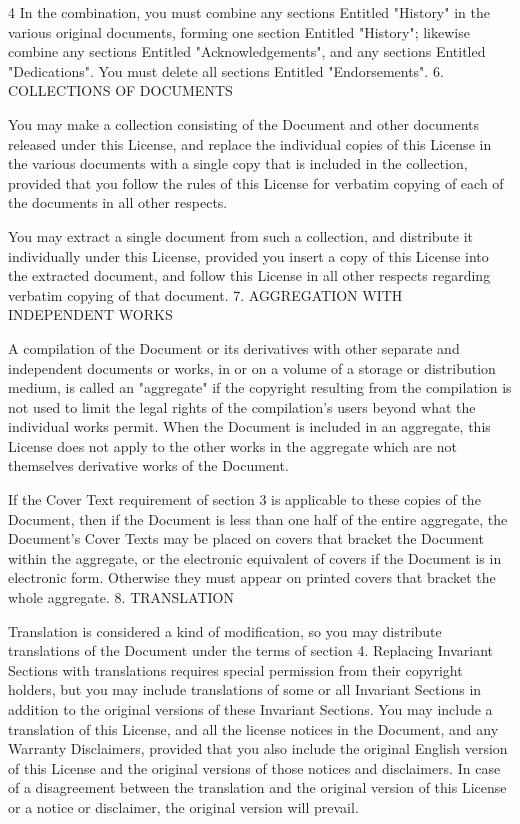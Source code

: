 \documentclass[fontsize=11pt,paper=A4,BCOR=12mm,DIV=13,open=any,listof=totoc,toc=flat]{scrbook}
\begin{document}
{\begin{multicols}{4}
In the combination, you must combine any sections Entitled "History" in the various original documents, forming one section Entitled "History"; likewise combine any sections Entitled "Acknowledgements", and any sections Entitled "Dedications". You must delete all sections Entitled "Endorsements".
6. COLLECTIONS OF DOCUMENTS

You may make a collection consisting of the Document and other documents released under this License, and replace the individual copies of this License in the various documents with a single copy that is included in the collection, provided that you follow the rules of this License for verbatim copying of each of the documents in all other respects.

You may extract a single document from such a collection, and distribute it individually under this License, provided you insert a copy of this License into the extracted document, and follow this License in all other respects regarding verbatim copying of that document.
7. AGGREGATION WITH INDEPENDENT WORKS

A compilation of the Document or its derivatives with other separate and independent documents or works, in or on a volume of a storage or distribution medium, is called an "aggregate" if the copyright resulting from the compilation is not used to limit the legal rights of the compilation's users beyond what the individual works permit. When the Document is included in an aggregate, this License does not apply to the other works in the aggregate which are not themselves derivative works of the Document.

If the Cover Text requirement of section 3 is applicable to these copies of the Document, then if the Document is less than one half of the entire aggregate, the Document's Cover Texts may be placed on covers that bracket the Document within the aggregate, or the electronic equivalent of covers if the Document is in electronic form. Otherwise they must appear on printed covers that bracket the whole aggregate.
8. TRANSLATION

Translation is considered a kind of modification, so you may distribute translations of the Document under the terms of section 4. Replacing Invariant Sections with translations requires special permission from their copyright holders, but you may include translations of some or all Invariant Sections in addition to the original versions of these Invariant Sections. You may include a translation of this License, and all the license notices in the Document, and any Warranty Disclaimers, provided that you also include the original English version of this License and the original versions of those notices and disclaimers. In case of a disagreement between the translation and the original version of this License or a notice or disclaimer, the original version will prevail.


\end{multicols}}
\end{document}

